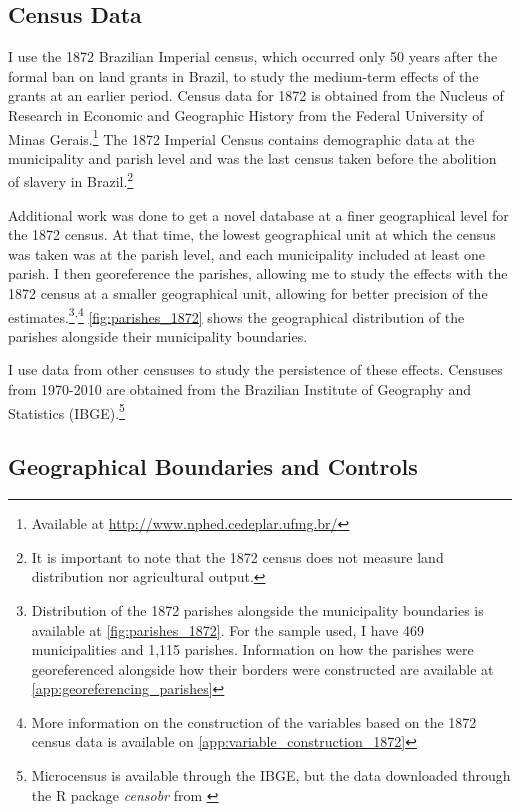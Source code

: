 \documentclass[11pt]{article}
\begin{document}
\subsection{Census Data}

I use the 1872 Brazilian Imperial census, which occurred only 50 years after the formal ban on land grants in Brazil, to study the medium-term effects of the grants at an earlier period.
Census data for 1872 is obtained from the Nucleus of Research in Economic and Geographic History from the Federal University of Minas Gerais.\footnote{
  Available at \url{http://www.nphed.cedeplar.ufmg.br/}}
The 1872 Imperial Census contains demographic data at the municipality and parish level and was the last census taken before the abolition of slavery in Brazil.\footnote{It is important to note that the 1872 census does not measure land distribution nor agricultural output.}

Additional work was done to get a novel database at a finer geographical level for the 1872 census.
At that time, the lowest geographical unit at which the census was taken was at the parish level, and each municipality included at least one parish.
I then georeference the parishes, allowing me to study the effects with the 1872 census at a smaller geographical unit, allowing for better precision of the estimates.\footnote{Distribution of the 1872 parishes alongside the municipality boundaries is available at \autoref{fig:parishes_1872}. For the sample used, I have 469 municipalities and 1,115 parishes. Information on how the parishes were georeferenced alongside how their borders were constructed are available at \autoref{app:georeferencing_parishes}}\textsuperscript{,}\footnote{More information on the construction of the variables based on the 1872 census data is available on \autoref{app:variable_construction_1872}} 
\autoref{fig:parishes_1872} shows the geographical distribution of the parishes alongside their municipality boundaries. 

I use data from other censuses to study the persistence of these effects.
Censuses from 1970-2010 are obtained from the Brazilian Institute of Geography and Statistics (IBGE).\footnote{Microcensus is available through the IBGE, but the data downloaded through the R package \textit{censobr} from \textcite{Pereira2023-qv}}

\subsection{Geographical Boundaries and Controls}
\end{document}
